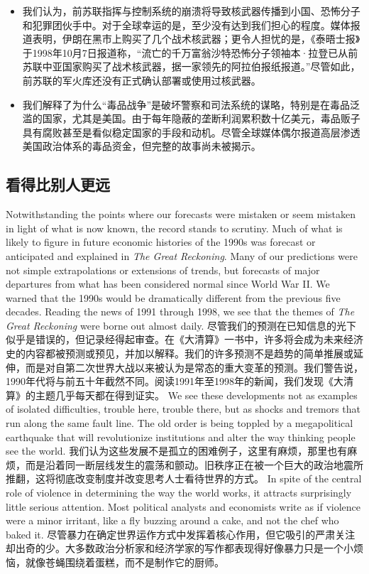 \begin{paracol}{2}
\begin{itemize}
		\item 我们认为，前苏联指挥与控制系统的崩溃将导致核武器传播到小国、恐怖分子和犯罪团伙手中。对于全球幸运的是，至少没有达到我们担心的程度。媒体报道表明，伊朗在黑市上购买了几个战术核武器；更令人担忧的是，《泰晤士报》于1998年10月7日报道称，“流亡的千万富翁沙特恐怖分子领袖本·拉登已从前苏联中亚国家购买了战术核武器，据一家领先的阿拉伯报纸报道。”尽管如此，前苏联的军火库还没有正式确认部署或使用过核武器。
		\item 我们解释了为什么“毒品战争”是破坏警察和司法系统的谋略，特别是在毒品泛滥的国家，尤其是美国。由于每年隐蔽的垄断利润累积数十亿美元，毒品贩子具有腐败甚至是看似稳定国家的手段和动机。尽管全球媒体偶尔报道高层渗透美国政治体系的毒品资金，但完整的故事尚未被揭示。
	\end{itemize}
	

\end{paracol}

\subsection{看得比别人更远}
\begin{paracol}{2}
	Notwithstanding the points where our forecasts were mistaken or seem mistaken in light of what is now known, the record stands to scrutiny. Much of what is likely to figure in future economic histories of the 1990s was forecast or anticipated and explained in \emph{The Great Reckoning}. Many of our predictions were not simple extrapolations or extensions of trends, but forecasts of major departures from what has been considered normal since World War II. We warned that the 1990s would be dramatically different from the previous five decades. Reading the news of 1991 through 1998, we see that the themes of \emph{The Great Reckoning} were borne out almost daily.
	\switchcolumn
	尽管我们的预测在已知信息的光下似乎是错误的，但记录经得起审查。在《大清算》一书中，许多将会成为未来经济史的内容都被预测或预见，并加以解释。我们的许多预测不是趋势的简单推展或延伸，而是对自第二次世界大战以来被认为是常态的重大变革的预测。我们警告说，1990年代将与前五十年截然不同。阅读1991年至1998年的新闻，我们发现《大清算》的主题几乎每天都在得到证实。
	\switchcolumn*
	We see these developments not as examples of isolated difficulties, trouble here, trouble there, but as shocks and tremors that run along the same fault line. The old order is being toppled by a megapolitical earthquake that will revolutionize institutions and alter the way thinking people see the world.
	\switchcolumn
	我们认为这些发展不是孤立的困难例子，这里有麻烦，那里也有麻烦，而是沿着同一断层线发生的震荡和颤动。旧秩序正在被一个巨大的政治地震所推翻，这将彻底改变制度并改变思考人士看待世界的方式。
	\switchcolumn*
	In spite of the central role of violence in determining the way the world works, it attracts surprisingly little serious attention. Most political analysts and economists write as if violence were a minor irritant, like a fly buzzing around a cake, and not the chef who baked it.
	\switchcolumn
	尽管暴力在确定世界运作方式中发挥着核心作用，但它吸引的严肃关注却出奇的少。大多数政治分析家和经济学家的写作都表现得好像暴力只是一个小烦恼，就像苍蝇围绕着蛋糕，而不是制作它的厨师。
\end{paracol}

